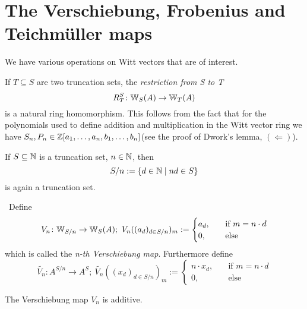 \section{The Verschiebung, Frobenius and Teichmüller maps}
We have various operations on Witt vectors that are of interest.
\begin{definition}
    If $T \subseteq S$ are two truncation sets, the \textit{restriction from S to T}
    \[
      R_T^S \colon \mathbb{W}_S(A) \to \mathbb{W}_T(A)  
    \]
    is a natural ring homomorphism. 
    This follows from the fact that
    for the polynomials used to define addition and multiplication in the Witt vector ring
    we have $S_n,P_n \in \mathbb{Z}[a_1,\dots,a_n,b_1,\dots,b_n]$(see the proof of Dwork's lemma, $(\Leftarrow)$).
    
\end{definition}
\todo{}
If $S\subseteq \mathbb{N}$ is a truncation set, $n \in \mathbb{N}$, then
\[
   S/n := \{d \in \mathbb{N} \mid nd \in S\}
\]
is again a truncation set.
\begin{definition}[Verschiebung] \
    Define 
    \[
        V_n \colon \mathbb{W}_{S/n} \to \mathbb{W}_S(A);\  
        V_n((a_d)_{d \in S/n})_m := 
        \begin{cases}
            a_d, &\quad \text{if $m=n \cdot d$} \\
            0,  &\quad \text{else}
        \end{cases}
    \]
    which is called the \textit{n-th Verschiebung map}. Furthermore define
    \[
        \widetilde{V_n} \colon A^{S/n} \to A^S;\ 
        \widetilde{V_n}((x_d)_{d \in S/n})_m := 
        \begin{cases}
            n \cdot x_d, &\quad \text{if $m=n \cdot d$} \\
            0,  &\quad \text{else}
        \end{cases}
    \]
\end{definition}
\begin{lemma} \label{lem: verschiebung is additive}
    The Verschiebung map $V_n$ is additive.
\end{lemma}
